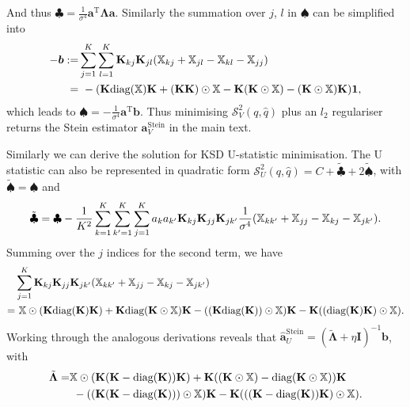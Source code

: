 And thus $\clubsuit = \frac{1}{\sigma^4} \bm{a}^{\text{T}} \bm{\Lambda} \bm{a}$. Similarly the summation over $j$, $l$ in $\spadesuit$ can be simplified into
\begin{equation*}
\begin{aligned}
-\bm{b} :=& \sum_{j=1}^K \sum_{l=1}^K \mathbf{K}_{kj} \mathbf{K}_{jl} (\mathbb{X}_{kj} + \mathbb{X}_{jl} - \mathbb{X}_{kl} - \mathbb{X}_{jj} )  \\
=& \ -( \mathbf{K} \text{diag}(\mathbb{X}) \mathbf{K} + (\mathbf{K} \mathbf{K}) \odot \mathbb{X} - \mathbf{K} (\mathbf{K} \odot \mathbb{X}) - (\mathbf{K} \odot \mathbb{X}) \mathbf{K} ) \bm{1},
\end{aligned}
\end{equation*}
which leads to $\spadesuit = -\frac{1}{\sigma^4} \bm{a}^{\text{T}} \bm{b}$. Thus minimising $\mathcal{S}_{V}^2(q, \hat{q})$ plus an $l_2$ regulariser returns the Stein estimator $\bm{a}_V^{\text{Stein}}$ in the main text.

Similarly we can derive the solution for KSD U-statistic minimisation. The U statistic can also be represented in quadratic form $\mathcal{S}_{U}^2(q, \hat{q}) = C + \tilde{\clubsuit} + 2 \tilde{\spadesuit}$, with $\tilde{\spadesuit} = \spadesuit$ and 
$$\tilde{\clubsuit} = \clubsuit -  \frac{1}{K^2} \sum_{k=1}^K \sum_{k'=1}^K \sum_{j=1}^K a_k a_{k'} \mathbf{K}_{kj} \mathbf{K}_{jj} \mathbf{K}_{jk'} \frac{1}{\sigma^4} (\mathbb{X}_{kk'} + \mathbb{X}_{jj} - \mathbb{X}_{kj} - \mathbb{X}_{jk'}).$$
Summing over the $j$ indices for the second term, we have
\begin{equation*}
\begin{aligned}
& \sum_{j=1}^K \mathbf{K}_{kj} \mathbf{K}_{jj} \mathbf{K}_{jk'} (\mathbb{X}_{kk'} + \mathbb{X}_{jj} - \mathbb{X}_{kj} - \mathbb{X}_{jk'}) \\
=& \  \mathbb{X} \odot (\mathbf{K} \text{diag}(\mathbf{K}) \mathbf{K}) + \mathbf{K} \text{diag}(\mathbf{K} \odot \mathbb{X}) \mathbf{K} - ((\mathbf{K} \text{diag}(\mathbf{K})) \odot \mathbb{X}) \mathbf{K} - \mathbf{K} ((\text{diag}(\mathbf{K})\mathbf{K}) \odot \mathbb{X}).
\end{aligned}
\end{equation*}
Working through the analogous derivations reveals that $\hat{\bm{a}}_U^{\text{Stein}} = (\tilde{\bm{\Lambda}} + \eta \mathbf{I})^{-1} \bm{b}$, with
\begin{equation*}
\begin{aligned}
\tilde{\bm{\Lambda}} =& \mathbb{X} \odot (\mathbf{K} (\mathbf{K} - \text{diag}(\mathbf{K})) \mathbf{K}) + \mathbf{K} ( (\mathbf{K} \odot \mathbb{X}) - \text{diag}(\mathbf{K} \odot \mathbb{X}) ) \mathbf{K} \\
&\ - ((\mathbf{K} (\mathbf{K} - \text{diag}(\mathbf{K}))) \odot \mathbb{X}) \mathbf{K} - \mathbf{K} (( (\mathbf{K} - \text{diag}(\mathbf{K})) \mathbf{K}) \odot \mathbb{X}).
\end{aligned}
\end{equation*}


